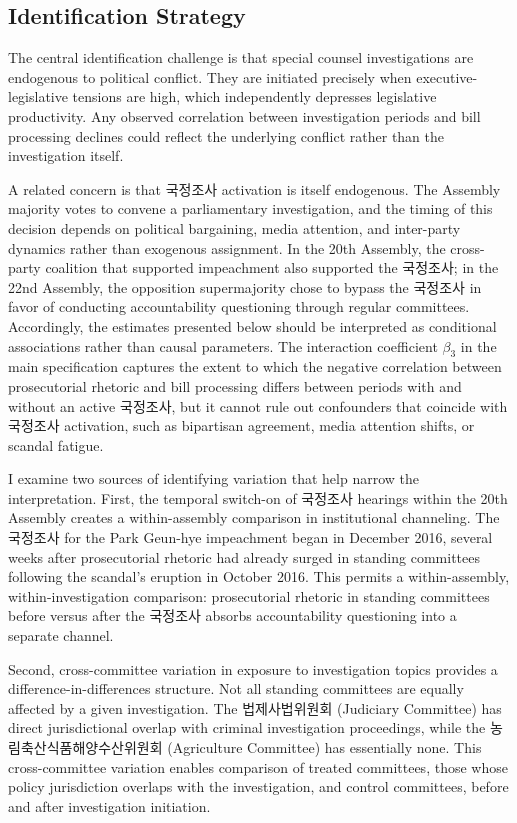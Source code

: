 \documentclass[11pt]{article}
\begin{document}
\subsection{Identification Strategy}
\label{sec:identification}

The central identification challenge is that special counsel investigations are endogenous to political conflict. They are initiated precisely when executive-legislative tensions are high, which independently depresses legislative productivity. Any observed correlation between investigation periods and bill processing declines could reflect the underlying conflict rather than the investigation itself.

A related concern is that 국정조사 activation is itself endogenous. The Assembly majority votes to convene a parliamentary investigation, and the timing of this decision depends on political bargaining, media attention, and inter-party dynamics rather than exogenous assignment. In the 20th Assembly, the cross-party coalition that supported impeachment also supported the 국정조사; in the 22nd Assembly, the opposition supermajority chose to bypass the 국정조사 in favor of conducting accountability questioning through regular committees. Accordingly, the estimates presented below should be interpreted as conditional associations rather than causal parameters. The interaction coefficient $\beta_3$ in the main specification captures the extent to which the negative correlation between prosecutorial rhetoric and bill processing differs between periods with and without an active 국정조사, but it cannot rule out confounders that coincide with 국정조사 activation, such as bipartisan agreement, media attention shifts, or scandal fatigue.

I examine two sources of identifying variation that help narrow the interpretation. First, the temporal switch-on of 국정조사 hearings within the 20th Assembly creates a within-assembly comparison in institutional channeling. The 국정조사 for the Park Geun-hye impeachment began in December 2016, several weeks after prosecutorial rhetoric had already surged in standing committees following the scandal's eruption in October 2016. This permits a within-assembly, within-investigation comparison: prosecutorial rhetoric in standing committees before versus after the 국정조사 absorbs accountability questioning into a separate channel.

Second, cross-committee variation in exposure to investigation topics provides a difference-in-differences structure. Not all standing committees are equally affected by a given investigation. The 법제사법위원회 (Judiciary Committee) has direct jurisdictional overlap with criminal investigation proceedings, while the 농림축산식품해양수산위원회 (Agriculture Committee) has essentially none. This cross-committee variation enables comparison of treated committees, those whose policy jurisdiction overlaps with the investigation, and control committees, before and after investigation initiation.
\end{document}
